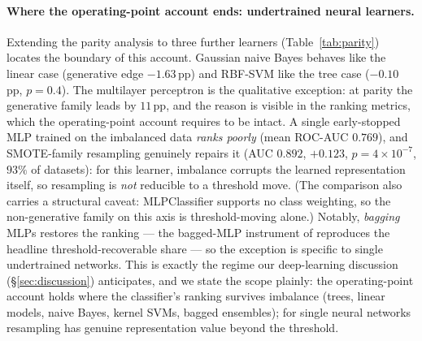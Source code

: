 \paragraph{Where the operating-point account ends: undertrained neural
learners.} Extending the parity analysis to three further learners
(Table~\ref{tab:parity}) locates the boundary of this account. Gaussian naive
Bayes behaves like the linear case (generative edge $-1.63$\,pp) and RBF-SVM
like the tree case ($-0.10$\,pp, $p{=}0.4$). The multilayer perceptron is the
qualitative exception: at parity the generative family leads by $11$\,pp, and
the reason is visible in the ranking metrics, which the operating-point account
requires to be intact. A single early-stopped MLP trained on the imbalanced data
\emph{ranks poorly} (mean ROC-AUC $0.769$), and SMOTE-family resampling
genuinely repairs it (AUC $0.892$, $+0.123$, $p{=}4\times10^{-7}$, $93\%$ of
datasets): for this learner, imbalance corrupts the learned representation
itself, so resampling is \emph{not} reducible to a threshold move. (The
comparison also carries a structural caveat: MLPClassifier supports no class
weighting, so the non-generative family on this axis is threshold-moving alone.)
Notably, \emph{bagging} MLPs restores the ranking --- the bagged-MLP instrument
of  reproduces the headline threshold-recoverable share ---
so the exception is specific to single undertrained networks. This is exactly
the regime our deep-learning discussion (\S\ref{sec:discussion}) anticipates,
and we state the scope plainly: the operating-point account holds where the
classifier's ranking survives imbalance (trees, linear models, naive Bayes,
kernel SVMs, bagged ensembles); for single neural networks resampling has
genuine representation value beyond the threshold.

